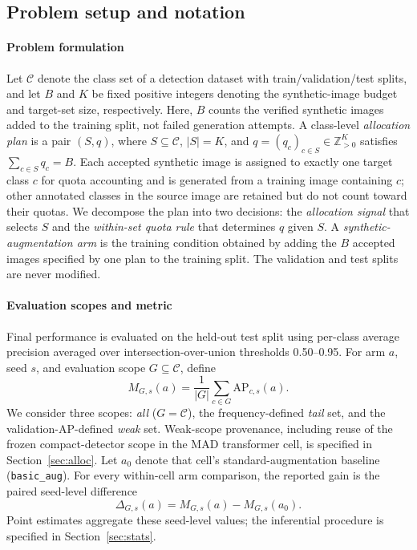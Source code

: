 \documentclass[preprint,12pt,authoryear]{elsarticle}
\begin{document}
\subsection{Problem setup and notation}\label{sec:prelim}

\paragraph{Problem formulation}
Let $\mathcal{C}$ denote the class set of a detection dataset with
train/validation/test splits, and let $B$ and $K$ be fixed positive
integers denoting the synthetic-image budget and target-set size,
respectively. Here, $B$ counts the verified synthetic images added to
the training split, not failed generation attempts. A class-level
\emph{allocation plan} is a pair $(S,q)$, where
$S \subseteq \mathcal{C}$, $|S|=K$, and
$q=(q_c)_{c\in S}\in\mathbb{Z}_{>0}^{K}$ satisfies
$\sum_{c\in S}q_c=B$. Each accepted synthetic image is assigned to
exactly one target class $c$ for quota accounting and is generated from
a training image containing $c$; other annotated classes in the source
image are retained but do not count toward their quotas. We decompose
the plan into two decisions: the \emph{allocation signal} that selects
$S$ and the \emph{within-set quota rule} that determines $q$ given $S$.
A \emph{synthetic-augmentation arm} is the training condition obtained
by adding the $B$ accepted images specified by one plan to the training
split. The validation and test splits are never modified.

\paragraph{Evaluation scopes and metric}
Final performance is evaluated on the held-out test split using
per-class average precision averaged over intersection-over-union
thresholds 0.50--0.95. For arm $a$, seed $s$, and evaluation scope
$G \subseteq \mathcal{C}$, define
\[
M_{G,s}(a)=\frac{1}{|G|}\sum_{c\in G}\mathrm{AP}_{c,s}(a).
\]
We consider three scopes: \emph{all} ($G=\mathcal{C}$), the
frequency-defined \emph{tail} set, and the validation-AP-defined
\emph{weak} set. Weak-scope provenance, including reuse of the frozen
compact-detector scope in the MAD transformer cell, is specified in
Section~\ref{sec:alloc}. Let $a_0$ denote that cell's
standard-augmentation baseline (\texttt{basic\_aug}). For every
within-cell arm comparison, the reported gain is the paired seed-level
difference
\[
\Delta_{G,s}(a)=M_{G,s}(a)-M_{G,s}(a_0).
\]
Point estimates aggregate these seed-level values; the inferential
procedure is specified in Section~\ref{sec:stats}.
\end{document}
